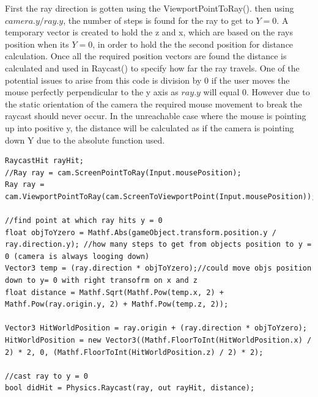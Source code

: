 First the ray direction is gotten using the ViewportPointToRay(). then using $camera.y / ray.y$, the number of steps is found for the ray to get to $Y=0$. A temporary vector is created to hold the z and x, which are based on the rays position when its $Y=0$, in order to hold the the second position for distance calculation. Once all the required position vectors are found the distance is calculated and used in Raycast() to specify how far the ray travels. One of the potential issues to arise from this code is division by 0 if the user moves the mouse perfectly perpendicular to the y axis as $ray.y$ will equal 0. However due to the static orientation of the camera the required mouse movement to break the raycast should never occur. In the unreachable case where the mouse is pointing up into positive y, the distance will be calculated as if the camera is pointing down Y due to the absolute function used.
\begin{minipage}{\textwidth}
\begin{lstlisting}[language={[Sharp]C}, caption=calculate distance for ray to travel, label=clst:rayDist]
RaycastHit rayHit;
//Ray ray = cam.ScreenPointToRay(Input.mousePosition);
Ray ray = cam.ViewportPointToRay(cam.ScreenToViewportPoint(Input.mousePosition));

//find point at which ray hits y = 0
float objToYzero = Mathf.Abs(gameObject.transform.position.y / ray.direction.y); //how many steps to get from objects position to y = 0 (camera is always looging down)
Vector3 temp = (ray.direction * objToYzero);//could move objs position down to y= 0 with right transofrm on x and z
float distance = Mathf.Sqrt(Mathf.Pow(temp.x, 2) + Mathf.Pow(ray.origin.y, 2) + Mathf.Pow(temp.z, 2));

Vector3 HitWorldPosition = ray.origin + (ray.direction * objToYzero);
HitWorldPosition = new Vector3((Mathf.FloorToInt(HitWorldPosition.x) / 2) * 2, 0, (Mathf.FloorToInt(HitWorldPosition.z) / 2) * 2);

//cast ray to y = 0
bool didHit = Physics.Raycast(ray, out rayHit, distance);
\end{lstlisting}
\end{minipage}
